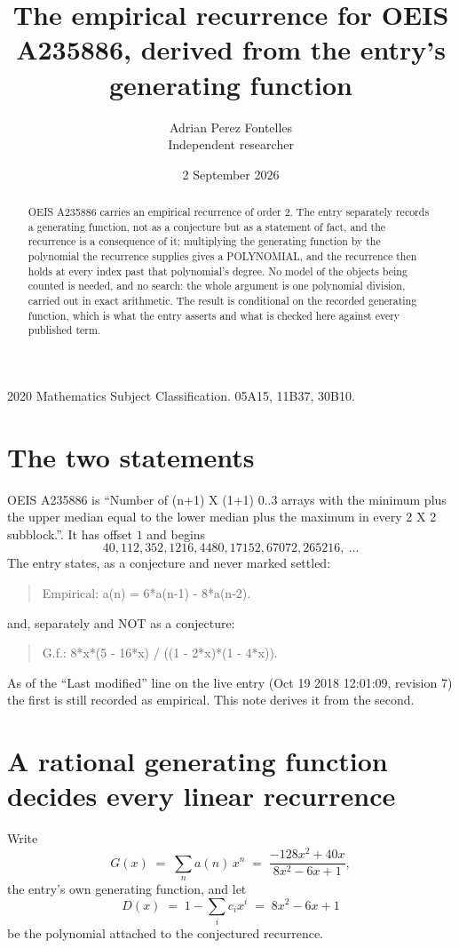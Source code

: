 \documentclass[11pt,a4paper]{article}
\title{The empirical recurrence for OEIS A235886, derived from the entry's generating function}
\author{Adrian Perez Fontelles\\ \small Independent researcher}
\date{2 September 2026}
\theoremstyle{plain}
\theoremstyle{definition}
\begin{document}
\maketitle

\begin{abstract}
OEIS A235886 carries an empirical recurrence of order $2$. The entry separately records a
generating function, not as a conjecture but as a statement of fact, and the recurrence is a
consequence of it: multiplying the generating function by the polynomial the recurrence
supplies gives a POLYNOMIAL, and the recurrence then holds at every index past that
polynomial's degree. No model of the objects being counted is needed, and no search: the
whole argument is one polynomial division, carried out in exact arithmetic. The result is
conditional on the recorded generating function, which is what the entry asserts and what is
checked here against every published term.
\end{abstract}

\noindent\small 2020 Mathematics Subject Classification. 05A15, 11B37, 30B10.\normalsize

\section{The two statements}

OEIS A235886 is ``Number of (n+1) X (1+1) 0..3 arrays with the minimum plus the upper median equal to the lower median plus the maximum in every 2 X 2 subblock.''. It has offset $1$ and begins
\[
40, 112, 352, 1216, 4480, 17152, 67072, 265216,\ \dots
\]
The entry states, as a conjecture and never marked settled:
\begin{quote}
Empirical: a(n) = 6*a(n-1) - 8*a(n-2).
\end{quote}
and, separately and NOT as a conjecture:
\begin{quote}
G.f.: 8*x*(5 - 16*x) / ((1 - 2*x)*(1 - 4*x)).
\end{quote}
As of the ``Last modified'' line on the live entry (Oct 19 2018 12:01:09, revision 7) the first is still
recorded as empirical. This note derives it from the second.

\section{A rational generating function decides every linear recurrence}

Write
\[
G(x)\;=\;\sum_{n}a(n)\,x^{n}\;=\;\frac{- 128 x^{2} + 40 x}{8 x^{2} - 6 x + 1},
\]
the entry's own generating function, and let
\[
D(x)\;=\;1-\sum_i c_i x^{i}\;=\;8 x^{2} - 6 x + 1
\]
be the polynomial attached to the conjectured recurrence.
\end{document}
